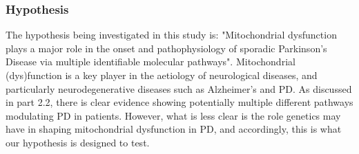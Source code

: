 \documentclass{article}
\begin{document}
\subsubsection{Hypothesis}
The hypothesis being investigated in this study is: "Mitochondrial dysfunction plays a major role in the onset and pathophysiology of sporadic Parkinson’s Disease via multiple identifiable molecular pathways". 
Mitochondrial (dys)function is a key player in the aetiology of neurological diseases\cite{Bartman2024MitochondrialDiseases}, and particularly neurodegenerative diseases such as Alzheimer's and PD\cite{MonzioCompagnoni2020TheDisease}. As discussed in part 2.2, there is clear evidence showing potentially multiple different pathways modulating PD in patients. However, what is less clear is the role genetics may have in shaping mitochondrial dysfunction in PD, and accordingly, this is what our hypothesis is designed to test.
\end{document}
